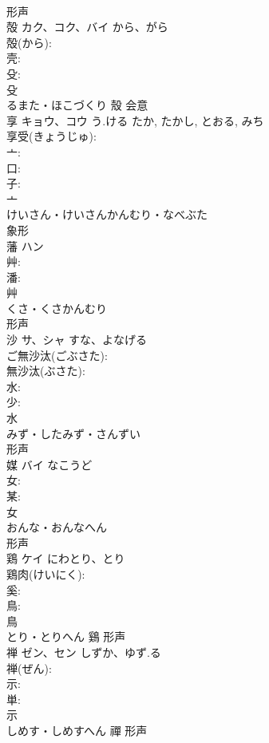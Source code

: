\documentclass[8pt]{extreport}
\begin{document}
\begin{CJK}{UTF8}{min}
\\	形声 
\\	殻	カク、コク、バイ	から、がら		
\\	殻(から): 
\\	壳: 
\\	殳: 
\\	殳	
\\	るまた・ほこづくり	殼	会意 
\\	享	キョウ、コウ	う.ける	たか, たかし, とおる, みち	
\\	享受(きょうじゅ): 
\\	亠: 
\\	口: 
\\	子: 
\\	亠	
\\	けいさん・けいさんかんむり・なべぶた	
\\	象形 
\\	藩	ハン			
\\	艸: 
\\	潘: 
\\	艸	
\\	くさ・くさかんむり	
\\	形声 
\\	沙	サ、シャ	すな、よなげる		
\\	ご無沙汰(ごぶさた): 
\\	無沙汰(ぶさた): 
\\	水: 
\\	少: 
\\	水	
\\	みず・したみず・さんずい	
\\	形声 
\\	媒	バイ	なこうど		
\\	女: 
\\	某: 
\\	女	
\\	おんな・おんなへん	
\\	形声 
\\	鶏	ケイ	にわとり、とり		
\\	鶏肉(けいにく): 
\\	奚: 
\\	鳥: 
\\	鳥	
\\	とり・とりへん	鷄	形声 
\\	禅	ゼン、セン	しずか、ゆず.る		
\\	禅(ぜん): 
\\	示: 
\\	単: 
\\	示	
\\	しめす・しめすへん	禪	形声 

\end{CJK}
\end{document}
